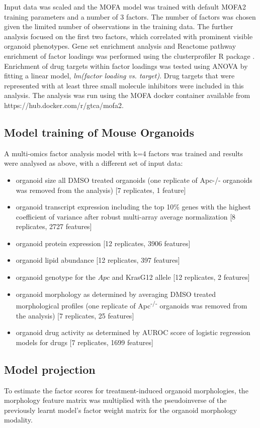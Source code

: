 \begin{flushleft}
Input data was scaled and the MOFA model was trained with default MOFA2 training parameters and a number of 3 factors. The number of factors was chosen given the limited number of observations in the training data. The further analysis focused on the first two factors, which correlated with prominent visible organoid phenotypes. Gene set enrichment analysis and Reactome pathway enrichment of factor loadings was performed using the clusterprofiler R package \parencite{yuClusterProfilerPackageComparing2012}. Enrichment of drug targets within factor loadings was tested using ANOVA by fitting a linear model, \textit{lm(factor loading vs. target)}. Drug targets that were represented with at least three small molecule inhibitors were included in this analysis. The analysis was run using the MOFA docker container available from https://hub.docker.com/r/gtca/mofa2.

\subsection{Model training of Mouse Organoids}
A multi-omics factor analysis model with k=4 factors was trained and results were analysed as above, with a different set of input data: 
\begin{itemize}
    \item organoid size all DMSO treated organoids (one replicate of Apc-/- organoids was removed from the analysis) [7 replicates, 1 feature]
    \item organoid transcript expression including the top 10\% genes with the highest coefficient of variance after robust multi-array average normalization [8 replicates, 2727 features]
    \item organoid protein expression [12 replicates, 3906 features]
    \item organoid lipid abundance [12 replicates, 397 features]
    \item organoid genotype for the $Apc$ and KrasG12 allele [12 replicates, 2 features]
    \item organoid morphology as determined by averaging DMSO treated morphological profiles (one replicate of Apc\textsuperscript{-/-} organoids was removed from the analysis) [7 replicates, 25 features]
    \item organoid drug activity as determined by AUROC score of logistic regression models for drugs [7 replicates, 1699 features]
\end{itemize}


\subsection{Model projection}
To estimate the factor scores for treatment-induced organoid morphologies, the morphology feature matrix was multiplied with the pseudoinverse of the previously learnt model's factor weight matrix for the organoid morphology modality. 


\end{flushleft}
